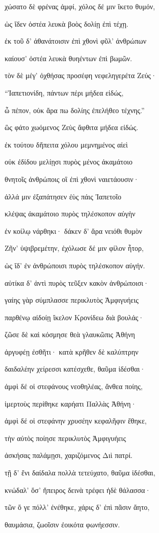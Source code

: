 \begin{pages}
\begin{Leftside}
χώσατο δὲ φρένας ἀμφί, χόλος δέ μιν ἵκετο θυμόν,

ὡς ἴδεν ὀστέα λευκὰ βοὸς δολίῃ ἐπὶ τέχῃ. 

ἐκ τοῦ δ' ἀθανάτοισιν ἐπὶ χθονὶ φῦλ' ἀνθρώπων

καίουσ' ὀστέα λευκὰ θυηέντων ἐπὶ βωμῶν. 

τὸν δὲ μέγ' ὀχθήσας προσέφη νεφεληγερέτα Ζεύς· 

``Ἰαπετιονίδη, πάντων πέρι μήδεα εἰδώς, 

ὦ πέπον, οὐκ ἄρα πω δολίης ἐπελήθεο τέχνης.''  

ὣς φάτο χωόμενος Ζεὺς ἄφθιτα μήδεα εἰδώς. 

ἐκ τούτου δἤπειτα χόλου μεμνημένος αἰεὶ 

οὐκ ἐδίδου μελίῃσι πυρὸς μένος ἀκαμάτοιο

θνητοῖς ἀνθρώποις οἳ ἐπὶ χθονὶ ναιετάουσιν· 

ἀλλά μιν ἐξαπάτησεν ἐὺς πάις Ἰαπετοῖο 

κλέψας ἀκαμάτοιο πυρὸς τηλέσκοπον αὐγὴν

ἐν κοίλῳ νάρθηκι· δάκεν δ' ἄρα νειόθι θυμὸν

Ζῆν' ὑψιβρεμέτην, ἐχόλωσε δέ μιν φίλον ἦτορ,

ὡς ἴδ' ἐν ἀνθρώποισι πυρὸς τηλέσκοπον αὐγήν.

αὐτίκα δ' ἀντὶ πυρὸς τεῦξεν κακὸν ἀνθρώποισι·  

γαίης γὰρ σύμπλασσε περικλυτὸς Ἀμφιγυήεις

παρθένῳ αἰδοίῃ ἴκελον Κρονίδεω διὰ βουλάς· 

ζῶσε δὲ καὶ κόσμησε θεὰ γλαυκῶπις Ἀθήνη

ἀργυφέῃ ἐσθῆτι· κατὰ κρῆθεν δὲ καλύπτρην 

δαιδαλέην χείρεσσι κατέσχεθε, θαῦμα ἰδέσθαι·  

ἀμφὶ δέ οἱ στεφάνους νεοθηλέας, ἄνθεα ποίης,

ἱμερτοὺς περίθηκε καρήατι Παλλὰς Ἀθήνη· 

ἀμφὶ δέ οἱ στεφάνην χρυσέην κεφαλῆφιν ἔθηκε,

τὴν αὐτὸς ποίησε περικλυτὸς Ἀμφιγυήεις

ἀσκήσας παλάμῃσι, χαριζόμενος Διὶ πατρί. 

τῇ δ' ἔνι δαίδαλα πολλὰ τετεύχατο, θαῦμα ἰδέσθαι,

κνώδαλ' ὅσ' ἤπειρος δεινὰ τρέφει ἠδὲ θάλασσα·

τῶν ὅ γε πόλλ' ἐνέθηκε, χάρις δ' ἐπὶ πᾶσιν ἄητο,

θαυμάσια, ζωοῖσιν ἐοικότα φωνήεσσιν.


\end{Leftside}
\end{pages}
